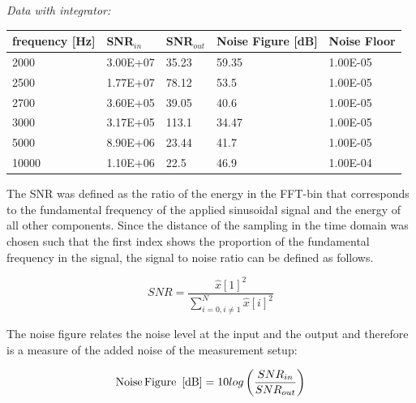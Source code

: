 \textit{Data with integrator:}
\begin{center}
\begin{tabular}{|m{3cm}|m{3cm}|m{2.5cm}|m{3.2cm}|m{2cm}|} 
\hline
frequency [Hz]& SNR$_{in}$ & SNR$_{out}$ & Noise Figure [dB] & Noise Floor \\ 
\hline \hline
2000 & 3.00E+07 & 35.23 & \cellcolor{blue!25}59.35 & 1.00E-05 \\ 
\hline
2500 & 1.77E+07 & 78.12 & \cellcolor{blue!25}53.5 & 1.00E-05 \\ 
\hline
2700 & 3.60E+05 & 39.05 & \cellcolor{blue!25}40.6 & 1.00E-05 \\ 
\hline
3000 & 3.17E+05 & 113.1 & \cellcolor{blue!25}34.47 & 1.00E-05 \\ 
\hline
5000 & 8.90E+06 & 23.44 & \cellcolor{blue!25}41.7 & 1.00E-05 \\ 
\hline
10000 & 1.10E+06 & 22.5 & \cellcolor{red!25}46.9 & 1.00E-04 \\ 
\hline

\end{tabular}

\end{center}
The SNR was defined as the ratio of the energy in the FFT-bin that corresponds
to the fundamental frequency of the applied sinusoidal signal and the energy of all other components. Since the distance of the sampling in the time domain was chosen
such that the first index shows the proportion of the fundamental frequency in the signal, the signal to
noise ratio can be defined as follows.


\begin{equation}
SNR=\frac{\hat{x}[1]^2}{\sum\limits_{i=0,i\neq1}^{N}\hat{x}[i]^2}
\end{equation}

The noise figure relates the noise level at the input and the output and therefore is a measure of the added noise of the measurement setup:

\begin{equation}
 \textrm{Noise\,Figure\, [dB]}=10 log\left(\frac{SNR_{in}}{SNR_{out}}\right)
\end{equation}

